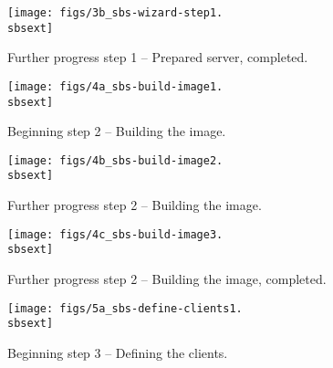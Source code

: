 \begin{figure}[htbp]
  \begin{center}
    \texttt{[image: figs/3b\_sbs-wizard-step1.\\sbsext]}
    \caption{Further progress step 1 -- Prepared server, completed.}
    \label{fig:sbs-install-wizard-s1b}
  \end{center}
\end{figure}





\begin{figure}[htbp]
  \begin{center}
    \texttt{[image: figs/4a\_sbs-build-image1.\\sbsext]}
    \caption{Beginning step 2 -- Building the image.}
    \label{fig:sbs-build-image}
  \end{center}
\end{figure}

\begin{figure}[htbp]
  \begin{center}
    \texttt{[image: figs/4b\_sbs-build-image2.\\sbsext]}
    \caption{Further progress step 2 -- Building the image.}
    \label{fig:sbs-build-image-progress}
  \end{center}
\end{figure}


\begin{figure}[htbp]
  \begin{center}
    \texttt{[image: figs/4c\_sbs-build-image3.\\sbsext]}
    \caption{Further progress step 2 -- Building the image, completed.}
    \label{fig:sbs-build-image2}
  \end{center}
\end{figure}

 
\begin{figure}[htbp]
  \begin{center}
    \texttt{[image: figs/5a\_sbs-define-clients1.\\sbsext]}
    \caption{Beginning step 3 -- Defining the clients.}
    \label{fig:sbs-define-clients}
  \end{center}
\end{figure}


